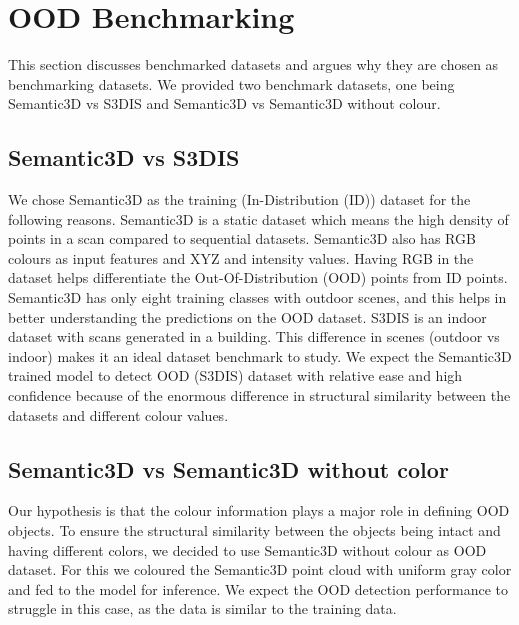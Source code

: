 \section{OOD Benchmarking}
This section discusses benchmarked datasets and argues why they are chosen as benchmarking datasets.
We provided two benchmark datasets, one being Semantic3D vs S3DIS and Semantic3D vs Semantic3D without colour.

\subsection{Semantic3D vs S3DIS}
We chose Semantic3D as the training (In-Distribution (ID)) dataset for the following reasons.
Semantic3D is a static dataset which means the high density of points in a scan compared to sequential datasets.
Semantic3D also has RGB colours as input features and XYZ and intensity values.
Having RGB in the dataset helps differentiate the Out-Of-Distribution (OOD) points from ID points.
Semantic3D has only eight training classes with outdoor scenes, and this helps in better understanding the predictions on the OOD dataset.
S3DIS is an indoor dataset with scans generated in a building.
This difference in scenes (outdoor vs indoor) makes it an ideal dataset benchmark to study.
We expect the Semantic3D trained model to detect OOD (S3DIS) dataset with relative ease and high confidence because of the enormous difference in structural similarity between the datasets and different colour values.

\subsection{Semantic3D vs Semantic3D without color}
Our hypothesis is that the colour information plays a major role in defining OOD objects.
To ensure the structural similarity between the objects being intact and having different colors, we decided to use Semantic3D without colour as OOD dataset.
For this we coloured the Semantic3D point cloud with uniform gray color and fed to the model for inference.
We expect the OOD detection performance to struggle in this case, as the data is similar to the training data.
